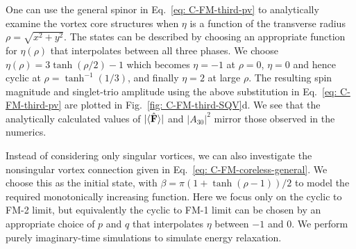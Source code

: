 One can use the general spinor in Eq.~\eqref{eq: C-FM-third-pv} to
analytically examine the vortex core structures when \(\eta \) is a
function of the transverse radius \(\rho = \sqrt{x^2 + y^2}\).
The states can be described by choosing an appropriate function for
\(\eta(\rho)\) that interpolates between all three phases.
We choose \(\eta(\rho) = 3\tanh(\rho/2) - 1\) which becomes \(\eta=-1\) at
\(\rho=0\), \(\eta=0\) and hence cyclic at \(\rho=\tanh^{-1}(1/3)\), and
finally \(\eta=2\) at large \(\rho \).
The resulting spin magnitude and singlet-trio amplitude using the above
substitution in Eq.~\eqref{eq: C-FM-third-pv} are plotted in
Fig.~\ref{fig: C-FM-third-SQV}d.
We see that the analytically calculated values of \(|\langle \hat{\vb{F}} \rangle | \) and
\(|A_{30}|^2\) mirror those observed in the numerics.

Instead of considering only singular vortices, we can also investigate the
nonsingular vortex connection given in Eq.~\eqref{eq: C-FM-coreless-general}.
We choose this as the initial state, with
\(\beta = \pi\left(1 + \tanh(\rho-1)\right)/2\) to model the required
monotonically increasing function.
Here we focus only on the cyclic to FM-2 limit, but equivalently the cyclic to
FM-1 limit can be chosen by an appropriate choice of \(p\) and \(q\) that
interpolates \(\eta \) between \(-1\) and \(0\).
We perform purely imaginary-time simulations to simulate energy relaxation.
